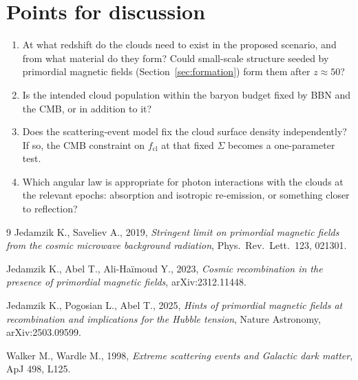 \documentclass[11pt,a4paper]{article}
\newcommand{\cl}{\mathrm{cl}}
\begin{document}
\section{Points for discussion}

\begin{enumerate}
\item At what redshift do the clouds need to exist in the proposed scenario, and from what material do they form? Could small-scale structure seeded by primordial magnetic fields (Section~\ref{sec:formation}) form them after $z \approx 50$?
\item Is the intended cloud population within the baryon budget fixed by BBN and the CMB, or in addition to it?
\item Does the scattering-event model fix the cloud surface density independently? If so, the CMB constraint on $f_\cl$ at that fixed $\Sigma$ becomes a one-parameter test.
\item Which angular law is appropriate for photon interactions with the clouds at the relevant epochs: absorption and isotropic re-emission, or something closer to reflection?
\end{enumerate}

\begin{thebibliography}{9}
Jedamzik K., Saveliev A., 2019, \emph{Stringent limit on primordial magnetic fields from the cosmic microwave background radiation}, Phys.\ Rev.\ Lett.\ 123, 021301.

Jedamzik K., Abel T., Ali-Ha\"imoud Y., 2023, \emph{Cosmic recombination in the presence of primordial magnetic fields}, arXiv:2312.11448.

Jedamzik K., Pogosian L., Abel T., 2025, \emph{Hints of primordial magnetic fields at recombination and implications for the Hubble tension}, Nature Astronomy, arXiv:2503.09599.

Walker M., Wardle M., 1998, \emph{Extreme scattering events and Galactic dark matter}, ApJ 498, L125.
\end{thebibliography}
\end{document}
